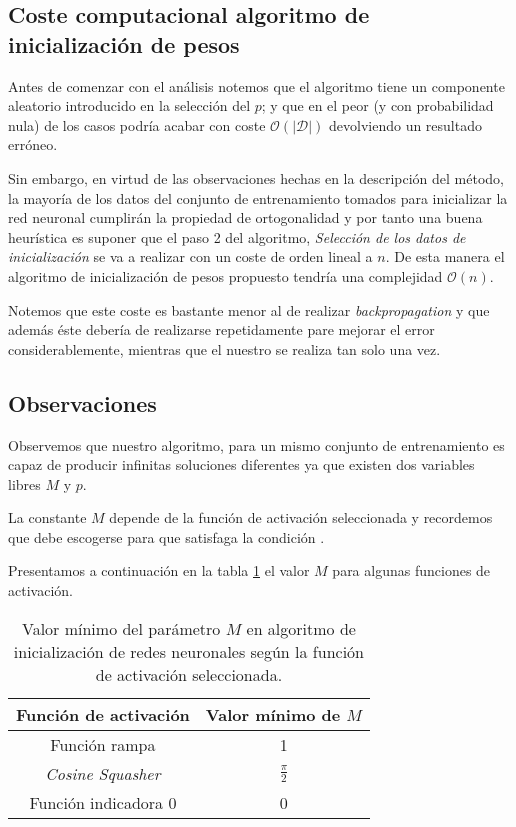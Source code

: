 \subsection{Coste computacional algoritmo de inicialización de pesos}

Antes de comenzar con el análisis notemos que el algoritmo tiene un componente aleatorio introducido en la selección del $p$; 
y que en el peor (y con probabilidad nula) de los casos podría acabar con coste $\mathcal{O}(|\mathcal{D}|)$ devolviendo un resultado erróneo. 

Sin embargo, en virtud de las observaciones hechas en la 
descripción del método, la mayoría de los datos del conjunto de entrenamiento tomados para inicializar la red neuronal cumplirán la propiedad de ortogonalidad y por tanto una buena 
heurística es suponer 
que  el paso 2 del algoritmo, \textit{Selección  de los datos de inicialización} se va a realizar con un coste de orden lineal a $n$. De esta manera el algoritmo de inicialización de pesos propuesto tendría una complejidad $\mathcal{O}(n)$.

Notemos que este coste es bastante menor al de realizar \textit{backpropagation} y que además éste debería de realizarse repetidamente pare mejorar el error considerablemente,  mientras que el nuestro se realiza tan solo una vez. 


\subsection{Observaciones }

Observemos que nuestro algoritmo, para un mismo conjunto de entrenamiento  es capaz de producir infinitas soluciones 
diferentes ya que 
existen dos variables libres $M$ y $p$. 

La  constante $M$ depende de la función de activación seleccionada y recordemos que  debe escogerse para que satisfaga la condición . 

Presentamos a continuación en la tabla \ref{table:M-activation-function} el valor $M$ para algunas funciones de activación. 

\begin{table}[H]
    \centering
    \begin{tabular}{|c|c|}
    \hline
        Función de activación  & Valor mínimo de $M$ \\ \hline
        Función rampa & 1 \\ \hline
        \textit{Cosine Squasher} & $\frac{\pi}{2}$ \\ \hline
        Función indicadora 0 & 0 \\ \hline
    \end{tabular}
    \caption{Valor mínimo del parámetro $M$ en algoritmo de inicialización de redes neuronales según la función de activación seleccionada.}
    \label{table:M-activation-function}
\end{table}

